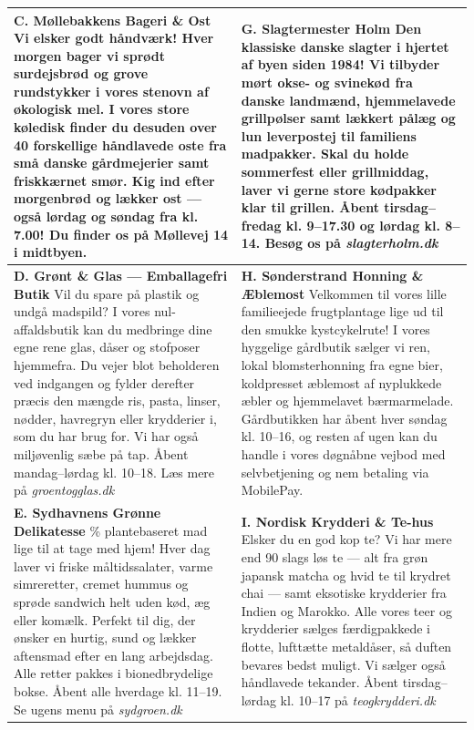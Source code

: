 {\begin{longtable}{@{} >{\raggedright\arraybackslash}p{8.2cm} @{\hspace{0.6cm}} >{\raggedright\arraybackslash}p{8.2cm} @{}}
\textbf{\color{NCDNavy}C. Møllebakkens Bageri \& Ost}\newline
Vi elsker godt håndværk! Hver morgen bager vi sprødt surdejsbrød og grove rundstykker i vores stenovn af økologisk mel. I vores store køledisk finder du desuden over 40 forskellige håndlavede oste fra små danske gårdmejerier samt friskkærnet smør. Kig ind efter morgenbrød og lækker ost --- også lørdag og søndag fra kl. 7.00! Du finder os på Møllevej 14 i midtbyen.
&
\textbf{\color{NCDNavy}G. Slagtermester Holm}\newline
Den klassiske danske slagter i hjertet af byen siden 1984! Vi tilbyder mørt okse- og svinekød fra danske landmænd, hjemmelavede grillpølser samt lækkert pålæg og lun leverpostej til familiens madpakker. Skal du holde sommerfest eller grillmiddag, laver vi gerne store kødpakker klar til grillen. Åbent tirsdag--fredag kl. 9--17.30 og lørdag kl. 8--14. Besøg os på \textit{slagterholm.dk} \\[6pt]
\midrule

\textbf{\color{NCDNavy}D. Grønt \& Glas --- Emballagefri Butik}\newline
Vil du spare på plastik og undgå madspild? I vores nul-affaldsbutik kan du medbringe dine egne rene glas, dåser og stofposer hjemmefra. Du vejer blot beholderen ved indgangen og fylder derefter præcis den mængde ris, pasta, linser, nødder, havregryn eller krydderier i, som du har brug for. Vi har også miljøvenlig sæbe på tap. Åbent mandag--lørdag kl. 10--18. Læs mere på \textit{groentogglas.dk}
&
\textbf{\color{NCDNavy}H. Sønderstrand Honning \& Æblemost}\newline
Velkommen til vores lille familieejede frugtplantage lige ud til den smukke kystcykelrute! I vores hyggelige gårdbutik sælger vi ren, lokal blomsterhonning fra egne bier, koldpresset æblemost af nyplukkede æbler og hjemmelavet bærmarmelade. Gårdbutikken har åbent hver søndag kl. 10--16, og resten af ugen kan du handle i vores døgnåbne vejbod med selvbetjening og nem betaling via MobilePay. \\[6pt]
\midrule

\textbf{\color{NCDNavy}E. Sydhavnens Grønne Delikatesse}\newline
100 \% plantebaseret mad lige til at tage med hjem! Hver dag laver vi friske måltidssalater, varme simreretter, cremet hummus og sprøde sandwich helt uden kød, æg eller komælk. Perfekt til dig, der ønsker en hurtig, sund og lækker aftensmad efter en lang arbejdsdag. Alle retter pakkes i bionedbrydelige bokse. Åbent alle hverdage kl. 11--19. Se ugens menu på \textit{sydgroen.dk}
&
\textbf{\color{NCDNavy}I. Nordisk Krydderi \& Te-hus}\newline
Elsker du en god kop te? Vi har mere end 90 slags løs te --- alt fra grøn japansk matcha og hvid te til krydret chai --- samt eksotiske krydderier fra Indien og Marokko. Alle vores teer og krydderier sælges færdigpakkede i flotte, lufttætte metaldåser, så duften bevares bedst muligt. Vi sælger også håndlavede tekander. Åbent tirsdag--lørdag kl. 10--17 på \textit{teogkrydderi.dk} \\
\end{longtable}
}

